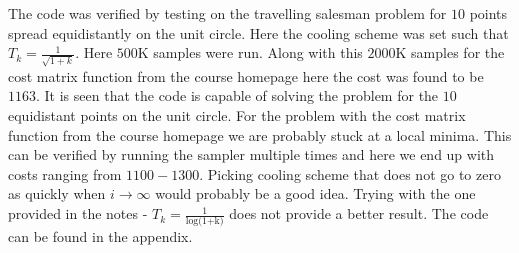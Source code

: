 The code was verified by testing on the travelling salesman problem for $10$ points spread equidistantly on the unit circle. Here the cooling scheme was set such that $T_k = \frac{1}{\sqrt{1+k}}$. Here $500$K samples were run. Along with this $2000$K samples for the cost matrix function from the course homepage here the cost was found to be $1163$. It is seen that the code is capable of solving the problem for the $10$ equidistant points on the unit circle. For the problem with the cost matrix function from the course homepage we are probably stuck at a local minima. This can be verified by running the sampler multiple times and here we end up with costs ranging from $1100-1300$. Picking cooling scheme that does not go to zero as quickly when $i \rightarrow \infty$ would probably be a good idea. Trying with the one provided in the notes - $T_k = \frac{1}{\text{log(1+k)}}$ does not provide a better result. The code can be found in the appendix. 
